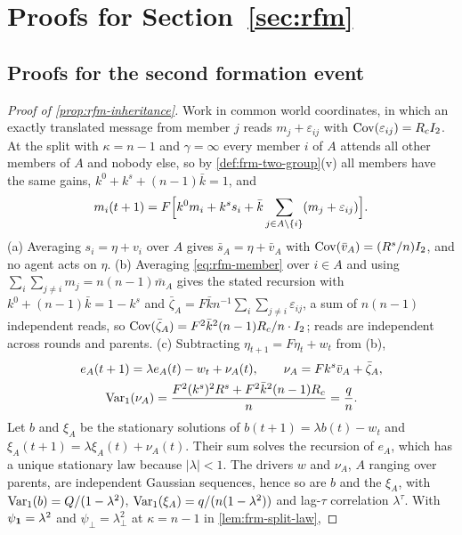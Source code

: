 \section{Proofs for \texorpdfstring{Section~\ref{sec:rfm}}{recursive formation}}\label{app:rfm}

\subsection{Proofs for the second formation event}\label{app:rfm-inheritance}

\begin{proof}[Proof of \cref{prop:rfm-inheritance}]
Work in common world coordinates, in which an exactly translated message from member $j$ reads $m_j+\varepsilon_{ij}$ with $\operatorname{Cov}(\varepsilon_{ij})=R_cI_2$. At the split with $\kappa=n-1$ and $\gamma=\infty$ every member $i$ of $A$ attends all other members of $A$ and nobody else, so by \cref{def:frm-two-group}(v) all members have the same gains, $k^0+k^s+(n-1)\bar k=1$, and
\begin{equation}\label{eq:rfm-member}
m_i(t+1)=F\Bigl[k^0m_i+k^ss_i+\bar k\sum_{j\in A\setminus\{i\}}(m_j+\varepsilon_{ij})\Bigr].
\end{equation}
(a) Averaging $s_i=\eta+v_i$ over $A$ gives $\bar s_A=\eta+\bar v_A$ with $\operatorname{Cov}(\bar v_A)=(R^s/n)I_2$, and no agent acts on $\eta$. (b) Averaging \eqref{eq:rfm-member} over $i\in A$ and using $\sum_{i}\sum_{j\ne i}m_j=n(n-1)\bar m_A$ gives the stated recursion with $k^0+(n-1)\bar k=1-k^s$ and $\bar\zeta_A=F\bar kn^{-1}\sum_i\sum_{j\ne i}\varepsilon_{ij}$, a sum of $n(n-1)$ independent reads, so $\operatorname{Cov}(\bar\zeta_A)=F^2\bar k^2(n-1)R_c/n\cdot I_2$; reads are independent across rounds and parents. (c) Subtracting $\eta_{t+1}=F\eta_t+w_t$ from (b),
\begin{gather*}
e_A(t+1)=\lambda e_A(t)-w_t+\nu_A(t),\qquad\nu_A=Fk^s\bar v_A+\bar\zeta_A,\\
\operatorname{Var}_1(\nu_A)=\frac{F^2(k^s)^2R^s+F^2\bar k^2(n-1)R_c}{n}=\frac qn.
\end{gather*}
Let $b$ and $\xi_A$ be the stationary solutions of $b(t+1)=\lambda b(t)-w_t$ and $\xi_A(t+1)=\lambda\xi_A(t)+\nu_A(t)$. Their sum solves the recursion of $e_A$, which has a unique stationary law because $|\lambda|<1$. The drivers $w$ and $\nu_A$, $A$ ranging over parents, are independent Gaussian sequences, hence so are $b$ and the $\xi_A$, with $\operatorname{Var}_1(b)=Q/(1-\lambda^2)$, $\operatorname{Var}_1(\xi_A)=q/(n(1-\lambda^2))$ and lag-$\tau$ correlation $\lambda^\tau$. With $\psi_{\mathbf{1}}=\lambda^2$ and $\psi_\perp=\lambda_\perp^2$ at $\kappa=n-1$ in \cref{lem:frm-split-law},

\end{proof}
